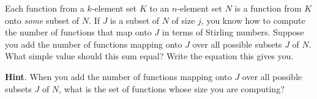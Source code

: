 \documentclass{book}
\begin{document}
\setcounter{cpjt}{204}
\addtocounter{cpjt}{-1}
\begin{activity}\label{Stirlingfalling}
\hypertarget{p-1101}{}%
Each function from a \(k\)-element set \(K\) to an \(n\)-element set \(N\) is a function from \(K\) onto \emph{some} subset of \(N\). If \(J\) is a subset of \(N\) of size \(j\), you know how to compute the number of functions that map onto \(J\) in terms of Stirling numbers. Suppose you add the number of functions mapping onto \(J\) over all possible subsets \(J\) of \(N\). What simple value should this sum equal? Write the equation this gives you.%
\par\smallskip%
\noindent\textbf{Hint}.\hypertarget{hint-129}{}\quad%
\hypertarget{p-1102}{}%
When you add the number of functions mapping onto \(J\) over all possible subsets \(J\) of \(N\), what is the set of functions whose size you are computing?%
\par\smallskip%
\noindent\end{activity}

\clearpage
\end{document}
